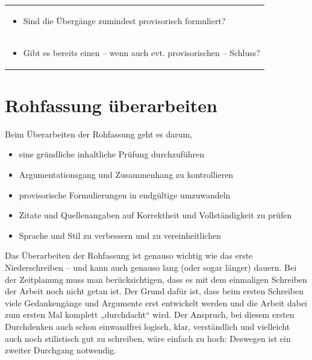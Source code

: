 \documentclass[]{book}
\providecommand{\tightlist}{%
  \setlength{\itemsep}{0pt}\setlength{\parskip}{0pt}}
\theoremstyle{definition}
\theoremstyle{definition}
\theoremstyle{definition}
\theoremstyle{remark}
\begin{document}
\begin{longtable}[]{@{}l@{}}
\begin{minipage}[t]{0.97\columnwidth}\raggedright\strut
\begin{itemize}
\tightlist
\item
  Sind die Übergänge zumindest provisorisch formuliert? \vspace{-6mm}
\end{itemize}\strut
\end{minipage}\tabularnewline
\begin{minipage}[t]{0.97\columnwidth}\raggedright\strut
\begin{itemize}
\tightlist
\item
  Gibt es bereits einen -- wenn auch evt. provisorischen -- Schluss?
\end{itemize}\strut
\end{minipage}\tabularnewline
\bottomrule
\end{longtable}

\section{Rohfassung überarbeiten}\label{rohfassung-uberarbeiten}

Beim Überarbeiten der Rohfassung geht es darum,

\begin{itemize}
\tightlist
\item
  eine gründliche inhaltliche Prüfung durchzuführen
\item
  Argumentationsgang und Zusammenhang zu kontrollieren
\item
  provisorische Formulierungen in endgültige umzuwandeln
\item
  Zitate und Quellenangaben auf Korrektheit und Vollständigkeit zu
  prüfen
\item
  Sprache und Stil zu verbessern und zu vereinheitlichen
\end{itemize}

Das Überarbeiten der Rohfassung ist genauso wichtig wie das erste
Niederschreiben -- und kann auch genauso lang (oder sogar länger)
dauern. Bei der Zeitplanung muss man berücksichtigen, dass es mit dem
einmaligen Schreiben der Arbeit noch nicht getan ist. Der Grund dafür
ist, dass beim ersten Schreiben viele Gedankengänge und Argumente erst
entwickelt werden und die Arbeit dabei zum ersten Mal komplett
„durchdacht`` wird. Der Anspruch, bei diesem ersten Durchdenken auch
schon einwandfrei logisch, klar, verständlich und vielleicht auch noch
stilistisch gut zu schreiben, wäre einfach zu hoch: Deswegen ist ein
zweiter Durchgang notwendig.
\end{document}
